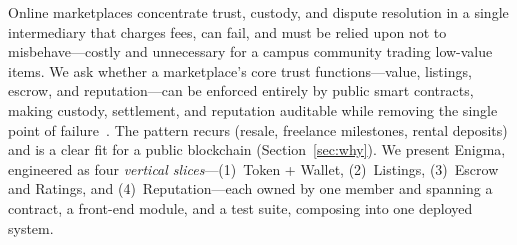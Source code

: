Online marketplaces concentrate trust, custody, and dispute resolution in a single intermediary that charges fees, can fail, and must be relied upon not to misbehave---costly and unnecessary for a campus community trading low-value items. We ask whether a marketplace's core trust functions---value, listings, escrow, and reputation---can be enforced entirely by public smart contracts, making custody, settlement, and reputation auditable while removing the single point of failure~\cite{nakamoto2008bitcoin,buterin2014ethereum}. The pattern recurs (resale, freelance milestones, rental deposits) and is a clear fit for a public blockchain (Section~\ref{sec:why}). We present Enigma, engineered as four \emph{vertical slices}---(1)~Token + Wallet, (2)~Listings, (3)~Escrow and Ratings, and (4)~Reputation---each owned by one member and spanning a contract, a front-end module, and a test suite, composing into one deployed system.

